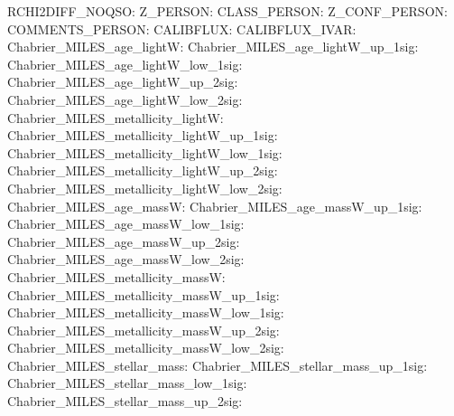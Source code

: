 RCHI2DIFF\_NOQSO:  \newline 
Z\_PERSON:  \newline 
CLASS\_PERSON:  \newline 
Z\_CONF\_PERSON:  \newline 
COMMENTS\_PERSON:  \newline 
CALIBFLUX:  \newline 
CALIBFLUX\_IVAR:  \newline 
Chabrier\_MILES\_age\_lightW:  \newline 
Chabrier\_MILES\_age\_lightW\_up\_1sig:  \newline 
Chabrier\_MILES\_age\_lightW\_low\_1sig:  \newline 
Chabrier\_MILES\_age\_lightW\_up\_2sig:  \newline 
Chabrier\_MILES\_age\_lightW\_low\_2sig:  \newline 
Chabrier\_MILES\_metallicity\_lightW:  \newline 
Chabrier\_MILES\_metallicity\_lightW\_up\_1sig:  \newline 
Chabrier\_MILES\_metallicity\_lightW\_low\_1sig:  \newline 
Chabrier\_MILES\_metallicity\_lightW\_up\_2sig:  \newline 
Chabrier\_MILES\_metallicity\_lightW\_low\_2sig:  \newline 
Chabrier\_MILES\_age\_massW:  \newline 
Chabrier\_MILES\_age\_massW\_up\_1sig:  \newline 
Chabrier\_MILES\_age\_massW\_low\_1sig:  \newline 
Chabrier\_MILES\_age\_massW\_up\_2sig:  \newline 
Chabrier\_MILES\_age\_massW\_low\_2sig:  \newline 
Chabrier\_MILES\_metallicity\_massW:  \newline 
Chabrier\_MILES\_metallicity\_massW\_up\_1sig:  \newline 
Chabrier\_MILES\_metallicity\_massW\_low\_1sig:  \newline 
Chabrier\_MILES\_metallicity\_massW\_up\_2sig:  \newline 
Chabrier\_MILES\_metallicity\_massW\_low\_2sig:  \newline 
Chabrier\_MILES\_stellar\_mass:  \newline 
Chabrier\_MILES\_stellar\_mass\_up\_1sig:  \newline 
Chabrier\_MILES\_stellar\_mass\_low\_1sig:  \newline 
Chabrier\_MILES\_stellar\_mass\_up\_2sig:  \newline 

